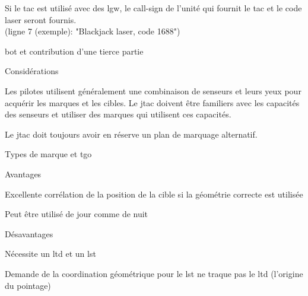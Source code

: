 \begin{e1}
\begin{e2}
\begin{e3}
			\item Si le \gls{tac} est utilisé avec des \gls{lgw}, le call-sign de l'unité qui fournit le \gls{tac} et le code laser seront fournis.\\ (ligne 7 (exemple): "Blackjack laser, code 1688")
		\end{e3}
		\item \gls{bot} et contribution d'une tierce partie
		\begin{e3}
\item Considérations
			\begin{e4}
				\item Les pilotes utilisent généralement une combinaison de senseurs et leurs yeux pour acquérir les marques et les cibles. Le \gls{jtac} doivent être familiers avec les capacités des senseurs et utiliser des marques qui utilisent ces capacités.
				\item Le \gls{jtac} doit toujours avoir en réserve un plan de marquage alternatif.
			\end{e4}
			\item Types de marque et \gls{tgo}
			\begin{e4}
				\begin{e5}
					\item Avantages
					\begin{e6}
						\item Excellente corrélation de la position de la cible si la géométrie correcte est utilisée
						\item Peut être utilisé de jour comme de nuit
					\end{e6}
					\item Désavantages
					\begin{e6}
							\item Nécessite un \gls{ltd} et un \gls{lst}
							\item Demande de la coordination géométrique pour le \gls{lst} ne traque pas le \gls{ltd} (l'origine du pointage)

\end{e6}
\end{e5}
\end{e4}
\end{e3}
\end{e2}
\end{e1}
